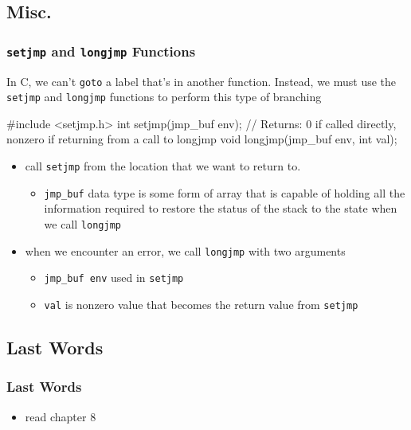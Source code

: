 \documentclass[newPxFont,sthlmFooter,nooffset]{beamer}
\begin{document}
\subsection{Misc.}

\begin{frame}[containsverbatim,t]
  \frametitle{\texttt{setjmp} and \texttt{longjmp} Functions}
In C, we can't \texttt{goto} a label that's in another function. Instead, we must use the \texttt{setjmp} and \texttt{longjmp} functions to perform this type of branching
\begin{codedef}
 #include <setjmp.h>
int setjmp(jmp_buf env);
// Returns: 0 if called directly, nonzero if returning from a call to longjmp
void longjmp(jmp_buf env, int val);
\end{codedef}
\begin{itemize}
\item call \texttt{setjmp} from the location that we want to return to.
  \begin{itemize}
  \item \texttt{jmp\_buf} data type is some form of array that is capable of holding all the information required to restore the status of the stack to the state when we call \texttt{longjmp}
  \end{itemize}
\item when we encounter an error, we call \texttt{longjmp} with two arguments
  \begin{itemize}
  \item \texttt{jmp\_buf env} used in \texttt{setjmp}
  \item \texttt{val} is nonzero value that becomes the return value from \texttt{setjmp}
  \end{itemize}
\end{itemize}
\end{frame}

\subsection{Last Words}

\begin{frame}
  \frametitle{Last Words}
  \begin{itemize}
  \item read chapter 8
  \end{itemize}
\end{frame}
\end{document}
